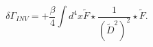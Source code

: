 \begin{equation}
\delta\Gamma_{INV}=+\frac\beta4\int d^4 x
\tilde F\star\frac1{(\tilde D^2)^2}\star\tilde F.
\label{newcounter}
\end{equation}

